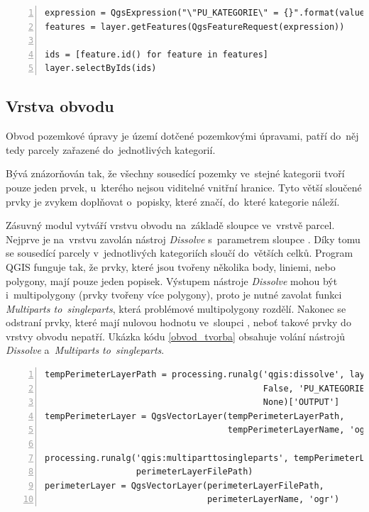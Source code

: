 {\scriptsize
\begin{lstlisting}[style=python, caption={Kategorie parcel~– výběr
prvků v~kategorii}, captionpos=b, label=vyber_v_kategorii,
backgroundcolor = \color{light-gray}, numbers=left]
expression = QgsExpression("\"PU_KATEGORIE\" = {}".format(value))
features = layer.getFeatures(QgsFeatureRequest(expression))

ids = [feature.id() for feature in features]
layer.selectByIds(ids)
\end{lstlisting}}

\subsection{Vrstva obvodu}
\label{vrstva_obvodu}

Obvod pozemkové úpravy je území dotčené pozemkovými úpravami, patří
do~něj tedy parcely zařazené do~jednotlivých kategorií.

Bývá znázorňován tak, že všechny sousedící pozemky ve~stejné kategorii
tvoří pouze jeden prvek, u~kterého nejsou viditelné vnitřní
hranice. Tyto větší sloučené prvky je zvykem doplňovat o~popisky,
které značí, do~které kategorie náleží.

Zásuvný modul vytváří vrstvu obvodu na~základě sloupce
\texttt{} ve~vrstvě parcel. Nejprve je
na~vrstvu \texttt{} zavolán nástroj \textit{Dissolve}
s~parametrem sloupce \texttt{}. Díky tomu se
sousedící parcely v~jednotlivých kategoriích sloučí do~větších
celků. Program QGIS funguje tak, že prvky, které jsou tvořeny několika
body, liniemi, nebo polygony, mají pouze jeden popisek. Výstupem
nástroje \textit{Dissolve} mohou být i~multipolygony (prvky tvořeny
více polygony), proto je nutné zavolat funkci \textit{Multiparts
to~singleparts}, která problémové multipolygony rozdělí. Nakonec se
odstraní prvky, které mají nulovou hodnotu ve~sloupci
\texttt{}, neboť takové prvky do vrstvy
obvodu nepatří. Ukázka kódu \ref{obvod_tvorba} obsahuje volání
nástrojů \textit{Dissolve} a~\textit{Multiparts to~singleparts}.

{\scriptsize
\begin{lstlisting}[style=python, caption={Vrstva obvodu~– tvorba},
captionpos=b, label=obvod_tvorba, backgroundcolor =
\color{light-gray}, numbers=left]
tempPerimeterLayerPath = processing.runalg('qgis:dissolve', layer,
                                           False, 'PU_KATEGORIE',
                                           None)['OUTPUT']
tempPerimeterLayer = QgsVectorLayer(tempPerimeterLayerPath,
                                    tempPerimeterLayerName, 'ogr')

processing.runalg('qgis:multiparttosingleparts', tempPerimeterLayer,
                  perimeterLayerFilePath)
perimeterLayer = QgsVectorLayer(perimeterLayerFilePath,
                                perimeterLayerName, 'ogr')
\end{lstlisting}}

